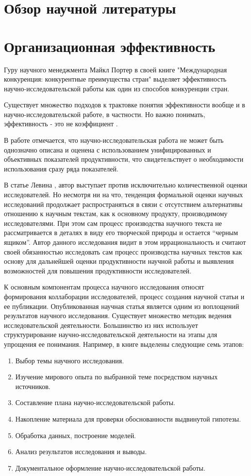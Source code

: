 \section{Обзор научной литературы}
\label{cha:review}
\section{Организационная эффективность}
Гуру научного менеджмента Майкл Портер в своей книге "Международная конкуренция: конкурентные преимущества стран" \cite{porter1993m} выделяет эффективность научно-исследовательской работы как один из способов конкуренции стран. 

Существует множество подходов к трактовке понятия эффективности вообще и в научно-исследовательской работе, в частности. Но важно понимать, эффективность - это не коэффициент \cite{tikin2009e}. 

В работе \cite{kle2014o} отмечается, что научно-исследовательская работа не может быть однозначно описана и оценена с использованием унифицированных и объективных показателей продуктивности, что свидетельствует о необходимости использования сразу ряда показателей. 

В статье Левина \cite{levin2016v}, автор выступает против исключительно количественной оценки исследователей. Но несмотря ни на что, тенденция формальной оценки научных исследований продолжает распространяться в связи с отсутствием альтернативы отношению к научным текстам, как к основному продукту, производимому исследователями. При этом сам процесс производства научного текста не рассматривается в деталях в виду его творческой природы и остается ``черным ящиком''. Автор данного исследования видит в этом иррациональность и считают своей обязанностью исследовать сам процесс производства научных текстов как основу для дальнейшей оценки продуктивности научной работы и выявления возможностей для повышения продуктивности исследователей.

К основным компонентам процесса научного исследования относят формирования коллаборации исследователей, процесс создания научной статьи и ее публикации. Опубликованная научная статья является одним из воплощений результатов научного исследования. Существует множество методик ведения исследовательской деятельности. Большинство из них использует структурирование научно-исследовательской деятельности на этапы для упрощения ее понимания. Например, в книге \cite{lipch2013met} выделены следующие семь этапов:
\begin{enumerate}
\tightlist
\item Выбор темы научного исследования.
\item Изучение мирового опыта по выбранной теме посредством научных источников.
\item Составление плана научно-исследовательской работы.
\item Накопление материала для проверки обоснованности выдвинутой гипотезы.
\item Обработка данных, построение моделей.
\item Анализ результатов исследования и выводы.
\item Документальное оформление научно-исследовательской работы.
\end{enumerate}

